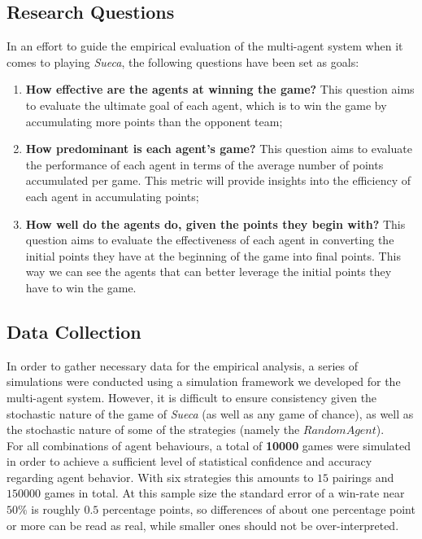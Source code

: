 \documentclass[sigconf]{acmart}
\begin{document}
\subsection{Research Questions}
\label{sec:rq}

In an effort to guide the empirical evaluation of the multi-agent system when it comes to playing \textit{Sueca}, the following questions have been set as goals:\\

\begin{enumerate}[label=\textbf{\arabic*}]
  \item \textbf{How effective are the agents at winning the game?} This question aims to evaluate the ultimate goal of each agent, which is to win the game by accumulating more points than the opponent team;\\

  \item \textbf{How predominant is each agent's game?} This question aims to evaluate the performance of each agent in terms of the average number of points accumulated per game. This metric will provide insights into the efficiency of each agent in accumulating points;\\

  \item \textbf{How well do the agents do, given the points they begin with?} This question aims to evaluate the effectiveness of each agent in converting the initial points they have at the beginning of the game into final points. This way we can see the agents that can better leverage the initial points they have to win the game.\\
\end{enumerate}

\subsection{Data Collection}

In order to gather necessary data for the empirical analysis, a series of simulations were conducted using a simulation framework we developed for the multi-agent system. However, it is difficult to ensure consistency given the stochastic nature of the game of \textit{Sueca} (as well as any game of chance), as well as the stochastic nature of some of the strategies (namely the $RandomAgent$).\\

\noindent For all combinations of agent behaviours, a total of \textbf{10000} games were simulated in order to achieve a sufficient level of statistical confidence and accuracy regarding agent behavior. With six strategies this amounts to $15$ pairings and $150000$ games in total. At this sample size the standard error of a win-rate near $50\%$ is roughly $0.5$ percentage points, so differences of about one percentage point or more can be read as real, while smaller ones should not be over-interpreted.\\
\end{document}
